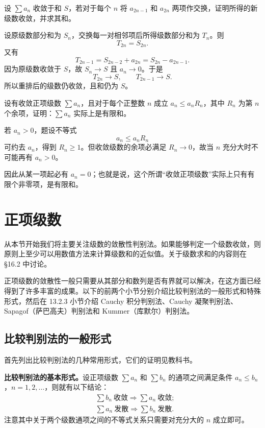 \begin{xthought}[9]
设 $\sum a_n$ 收敛于和 $S$，若对于每个 $n$ 将 $a_{2n-1}$ 和 $a_{2n}$ 两项作交换，证明所得的新级数收敛，并求其和。
\end{xthought}
\begin{xsolution}
设原级数部分和为 $S_n$，交换每一对相邻项后所得级数部分和为 $T_n$。则
\[
 T_{2n}=S_{2n}.
\]
又有
\[
 T_{2n-1}=S_{2n-2}+a_{2n}
 =S_{2n}-a_{2n-1}.
\]
因为原级数收敛于 $S$，故 $S_n\to S$ 且 $a_n\to0$。于是
\[
 T_{2n}\to S,
 \qquad
 T_{2n-1}\to S.
\]
所以重排后的级数仍收敛，且和仍为 $S$。
\end{xsolution}


\begin{xthought}[10]
设有收敛正项级数 $\sum a_n$，且对于每个正整数 $n$ 成立 $a_n\leq a_nR_n$，其中 $R_n$ 为第 $n$ 个余项，证明：$\sum a_n$ 实际上是有限和。
\end{xthought}
\begin{xsolution}
若 $a_n>0$，题设不等式
\[
 a_n\leq a_nR_n
\]
可约去 $a_n$，得到 $R_n\geq1$。但收敛级数的余项必满足 $R_n\to0$，故当 $n$ 充分大时不可能再有 $a_n>0$。

因此从某一项起必有 $a_n=0$；也就是说，这个所谓“收敛正项级数”实际上只有有限个非零项，是有限和。
\end{xsolution}


\section{正项级数}

从本节开始我们将主要关注级数的敛散性判别法。如果能够判定一个级数收敛，则原则上至少可以用数值方法来计算级数和的近似值。关于级数求和的内容则在 §16.2 中讨论。

正项级数的敛散性一般只需要从其部分和数列是否有界就可以解决，在这方面已经得到了许多丰富的成果。以下的前两个小节分别介绍比较判别法的一般形式和特殊形式，然后在 13.2.3 小节介绍 Cauchy 积分判别法、Cauchy 凝聚判别法、Sapagof（萨巴高夫）判别法和 Kummer（库默尔）判别法。

\subsection{比较判别法的一般形式}

首先列出比较判别法的几种常用形式，它们的证明见教科书。

\textbf{比较判别法的基本形式。}设正项级数 $\sum a_n$ 和 $\sum b_n$ 的通项之间满足条件 $a_n\leq b_n$，$n=1,2,\ldots$，则就有以下结论：
\begin{align}
&\sum b_n\ \text{收敛}\Longrightarrow\sum a_n\ \text{收敛}; \tag{13.10}\\
&\sum a_n\ \text{发散}\Longrightarrow\sum b_n\ \text{发散}. \tag{13.11}
\end{align}
注意其中关于两个级数通项之间的不等式关系只需要对充分大的 $n$ 成立即可。

